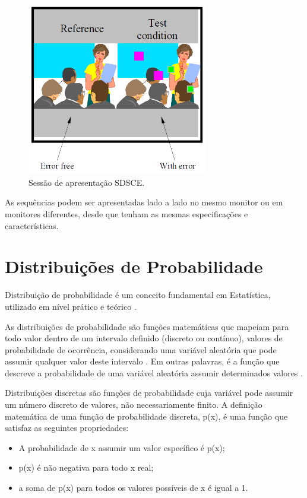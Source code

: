 \begin{figure}[!htb]
	\centering
	\includegraphics[width=0.7\textwidth]{./imgs/sdsce.png}
	\caption{Sessão de apresentação SDSCE.}
	\label{fig:sdsce}
\end{figure}

As sequências podem ser apresentadas lado a lado no mesmo monitor ou em monitores diferentes, desde que tenham as mesmas especificações e características.

\section{Distribuições de Probabilidade}

Distribuição de probabilidade é um conceito fundamental em Estatística, utilizado em nível prático e teórico \cite{distteoria}.

As distribuições de probabilidade são funções matemáticas que mapeiam para todo valor dentro de um intervalo definido (discreto ou contínuo), valores de probabilidade de ocorrência, considerando uma variável aleatória que pode assumir qualquer valor deste intervalo \cite{distteoria}. Em outras palavras, é a função que descreve a probabilidade de uma variável aleatória assumir determinados valores \cite{wikidistribuicoes}.
 
Distribuições discretas são funções de probabilidade cuja variável pode assumir um número discreto de valores, não necessariamente finito. A definição matemática de uma função de probabilidade discreta, p(x), é uma função que satisfaz as seguintes propriedades:

\begin{itemize}
	\item A probabilidade de x assumir um valor específico é p(x);
	\item p(x) é não negativa para todo x real;
	\item a soma de p(x) para todos os valores possíveis de x é igual a 1.
\end{itemize}


